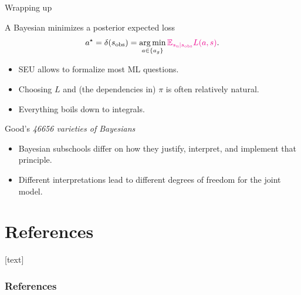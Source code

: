 \documentclass[10pt]{beamer}
\begin{document}



\begin{frame}{Wrapping up}
  \begin{block}{A Bayesian minimizes a posterior expected loss}
  $$
    a^\star = \delta(s_{\text{obs}}) = \operatorname*{arg\,min}_{a\in\{a_g\}} \textcolor{magenta}{\mathbb{E}_{s_{\text{u}}\vert s_{\text{obs}}} L(a,s)}.
  $$
  \end{block}
  \vfill
  \begin{itemize}
    \item SEU allows to formalize most ML questions.
    \item Choosing $L$ and (the dependencies in) $\pi$ is often relatively natural.
    \item Everything boils down to integrals.
  \end{itemize}
  \vfill
  \begin{alertblock}{Good's {\it 46656 varieties of Bayesians}}
    \begin{itemize}
      \item Bayesian subschools differ on how they justify, interpret, and implement that principle.
      \item Different interpretations lead to different degrees of freedom for the joint model.
    \end{itemize}
  \end{alertblock}
  
\end{frame}

\nocite{MaRo07,PaIn09,Rob07}

\section*{References}
[text]%
\begin{frame}[allowframebreaks]
\frametitle{References}
\small
\printbibliography
\normalsize
\end{frame}
\end{document}
